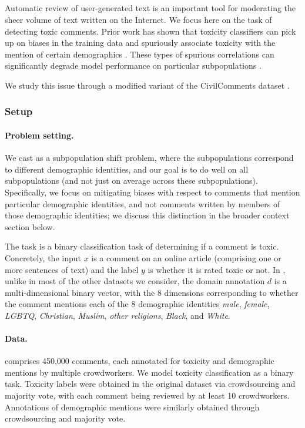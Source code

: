 \subsection{\CivilComments}\label{sec:app_civilcomments}
Automatic review of user-generated text is an important tool for moderating the sheer volume of text written on the Internet.
We focus here on the task of detecting toxic comments.
Prior work has shown that toxicity classifiers can pick up on biases in the training data and spuriously associate toxicity with the mention of certain demographics \citep{park2018reducing, dixon2018measuring}.
These types of spurious correlations can significantly degrade model performance on particular subpopulations \citep{sagawa2020group}.

We study this issue through a modified variant of the CivilComments dataset \citep{borkan2019nuanced}.

\subsubsection{Setup}
\paragraph{Problem setting.}
We cast \CivilComments as a subpopulation shift problem, where the subpopulations correspond to different demographic identities, and our goal is to do well on all subpopulations (and not just on average across these subpopulations).
Specifically, we focus on mitigating biases with respect to comments that mention particular demographic identities, and not comments written by members of those demographic identities; we discuss this distinction in the broader context section below.

The task is a binary classification task of determining if a comment is toxic.
Concretely, the input $x$ is a comment on an online article (comprising one or more sentences of text) and the label $y$ is whether it is rated toxic or not.
In \CivilComments, unlike in most of the other datasets we consider, the domain annotation $d$ is a multi-dimensional binary vector, with the 8 dimensions corresponding to whether the comment mentions each of the 8 demographic identities \textit{male}, \textit{female}, \textit{LGBTQ}, \textit{Christian}, \textit{Muslim}, \textit{other religions}, \textit{Black}, and \textit{White}.

\paragraph{Data.}
\CivilComments comprises 450,000 comments, each annotated for toxicity and demographic mentions by multiple crowdworkers. We model toxicity classification as a binary task. Toxicity labels were obtained in the original dataset via crowdsourcing and majority vote, with each comment being reviewed by at least 10 crowdworkers. Annotations of demographic mentions were similarly obtained through crowdsourcing and majority vote.

